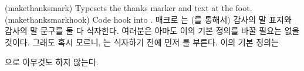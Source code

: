 \begin{comment}
\item Setting \verb?\thanksfootextra{ }? and \verb?\thanksscript{#1}? 
      right justifies the baseline mark and a space in the mark box:
   \begin{itemize}
   \item The normal style is
         defined by \verb?\thanksmarkwidth{1.8em}? and \\
         \verb?\thanksmargin{-\thanksmarkwidth}? which put the mark 
         indented and the text left adjusted, like a normal indented
         paragraph\index{paragraph!indentation}.
   \item \verb?\thanksmarkwidth{1.8em}? and
         \verb?\thanksmargin{0em}? put the mark indented 
         and the text indented and aligned.
   \end{itemize}

\end{itemize}

\end{comment}

\begin{syntax}
\cmd{\makethanksmark} \\
\cmd{\makethanksmarkhook} \\
\end{syntax}
\glossary(makethanksmark)%
  {}%
  {Typesets the thanks marker and text at the foot.}
\glossary(makethanksmarkhook)
  {}
  {Code hook into .}
매크로 \cmd{\makethanksmark}는 (\cmd{\thanksfootmark}를 통해서) 감사의 말
표지와 감사의 말 문구를 둘 다 식자한다.
여러분은 아마도 이의 기본 정의를 바꿀 필요는 없을 것이다.
그래도 혹시 모르니, \cmd{\makethanksmark}는 식자하기 전에 먼저
\cmd{\makethanksmarkhook}를 부른다.
이의 기본 정의는
\begin{lcode}
\newcommand{\makethanksmarkhook}{}
\end{lcode}
으로 아무것도 하지 않는다.

